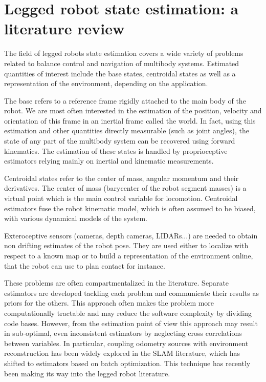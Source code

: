 \chapter{Legged robot state estimation: a literature review}
%
The field of legged robots state estimation covers a wide variety of problems related to balance control and navigation of multibody systems.
Estimated quantities of interest include the base states, centroidal states as well as a representation of the environment, depending on the application. 

The base refers to a reference frame rigidly attached to the main body of the robot. We are most often interested in the estimation of the position, velocity 
and orientation of this frame in an inertial frame called the world. 
In fact, using this estimation and other quantities directly measurable (such as joint angles), the state of any part of the multibody
system can be recovered using forward kinematics. The estimation of these states is handled by proprioceptive estimators relying 
mainly on inertial and kinematic measurements. 

Centroidal states refer to the center of mass, angular momentum and their derivatives. The center 
of mass (barycenter of the robot segment masses) is a virtual point which is the main control variable for locomotion. Centroidal
estimators fuse the robot kinematic model, which is often assumed to be biased, with various dynamical models of the system. 

Exteroceptive sensors (cameras, depth cameras, LIDARs...) are needed to obtain non drifting estimates of the robot pose. 
They are used either to localize with respect to a known map or to build a representation of the environment online, that the robot can use to plan contact for instance. 

These problems are often compartmentalized in the literature. Separate estimators are developed tackling each problem and communicate their results as priors for the others. 
This approach often makes the problem more computationally tractable and may reduce the software complexity by dividing code bases. However, from the estimation
point of view this approach may result in sub-optimal, even inconsistent estimators by neglecting cross correlations between variables. In particular,
coupling odometry sources with environment reconstruction has been widely explored in the SLAM literature, which has shifted to estimators based on batch optimization.
This technique has recently been making its way into the legged robot literature.

